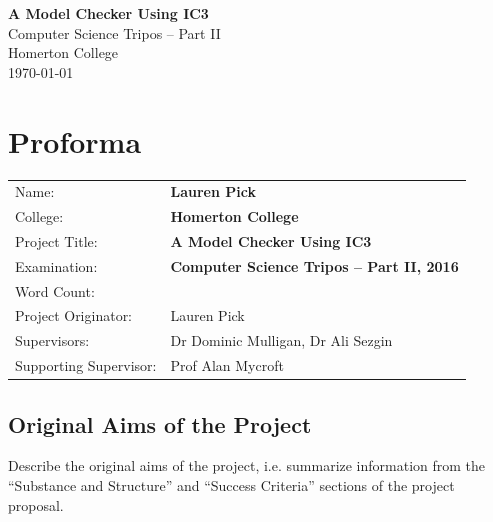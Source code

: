\documentclass[12pt,a4paper,twoside,openright]{report}
\begin{document}






\pagestyle{empty}


\vspace*{60mm}
\begin{center}
\Huge
\textbf{A Model Checker Using IC3} \\[5mm]
Computer Science Tripos -- Part II \\[5mm]
Homerton College \\[5mm]
\today  %
\end{center}


\pagestyle{plain}

\chapter*{Proforma}

{\large
\begin{tabular}{ll}
Name:                  & \bf Lauren Pick                           \\
College:               & \bf Homerton College                      \\
Project Title:         & \bf A Model Checker Using IC3             \\
Examination:        & \bf Computer Science Tripos -- Part II, 2016 \\
Word Count:            & \bf                                       \\
Project Originator:    & Lauren Pick                               \\
Supervisors:           & Dr Dominic Mulligan, Dr Ali Sezgin        \\ 
Supporting Supervisor: & Prof Alan Mycroft
\end{tabular}
}


\section*{Original Aims of the Project}

Describe the original aims of the project, i.e. summarize information from
the ``Substance and Structure'' and ``Success Criteria'' sections of the
project proposal.
\end{document}
